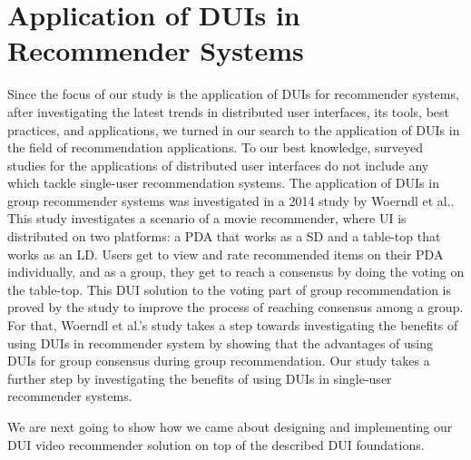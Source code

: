 \section{Application of DUIs in Recommender Systems}
Since the focus of our study is the application of DUIs for recommender
systems, after investigating the latest trends in distributed user interfaces,
its tools, best practices, and applications, we turned in our search to the application of DUIs in the field of recommendation applications. To our best knowledge,
surveyed studies for the applications of distributed user interfaces do not
include any which tackle single-user recommendation systems. The application of
DUIs in group recommender systems was investigated in a 2014 study by Woerndl et
al.\cite{worndlvoting}. This study investigates a scenario of a movie
recommender, where UI is distributed on two platforms: a PDA that works as a SD
and a table-top that works as an LD. Users get to view and rate recommended
items on their PDA individually, and as a group, they get to reach a
consensus by doing the voting on the table-top. This DUI solution to the
voting part of group recommendation is proved by the study to improve the
process of reaching consensus among a group. For that, Woerndl et al.'s study
takes a step towards investigating the benefits of using DUIs in recommender
system by showing that the advantages of using DUIs for group consensus during
group recommendation. Our study takes a further step by investigating the
benefits of using DUIs in single-user recommender systems.\par
We are next going to show how we came about designing and implementing our DUI
video recommender solution on top of the described DUI foundations. 
